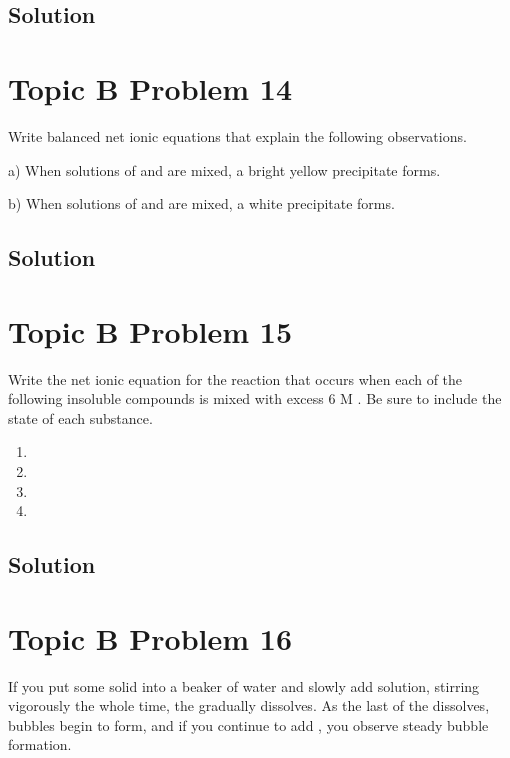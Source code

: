 \documentclass[10pt]{article}
\begin{document}
        \subsection{Solution}

    \pagebreak
    \section{Topic B Problem 14}
        Write balanced net ionic equations that explain the following observations.
        
        a) When solutions of  and  are mixed, a bright yellow precipitate forms.
        
        b) When solutions of  and  are mixed, a white precipitate forms.

        \subsection{Solution}

    \pagebreak
    \section{Topic B Problem 15}
        Write the net ionic equation for the reaction that occurs when each of the following insoluble compounds is mixed with excess 6 M . 
        Be sure to include the state of each substance.
        \begin{multicols}{4}
            \begin{enumerate}[label=\alph*)]
                \item {}
                \item {}
                \item {}
                \item {}
            \end{enumerate}
        \end{multicols}

        \subsection{Solution}

    \pagebreak
    \section{Topic B Problem 16}
        If you put some solid  into a beaker of water and slowly add  solution, stirring vigorously the whole time, the  gradually dissolves. 
        As the last of the  dissolves, bubbles begin to form, and if you continue to add , you observe steady bubble formation.
        
\end{document}
